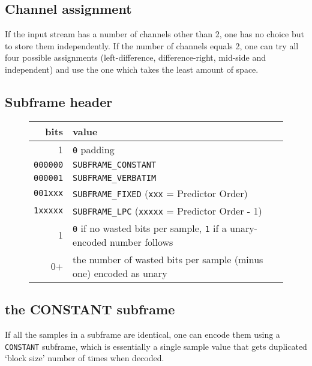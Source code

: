 
\subsection{Channel assignment}

If the input stream has a number of channels other than 2,
one has no choice but to store them independently.
If the number of channels equals 2, one can try all four possible
assignments (left-difference, difference-right, mid-side and
independent) and use the one which takes the least amount of space.

\subsection{Subframe header}
\begin{figure}[h]
\begin{tabular}{|r|l|}
\hline
bits & value \\
\hline
1 & \texttt{0} padding \\
\texttt{000000} & \texttt{SUBFRAME\_CONSTANT} \\
\texttt{000001} & \texttt{SUBFRAME\_VERBATIM} \\
\texttt{001xxx} & \texttt{SUBFRAME\_FIXED} (\texttt{xxx} = Predictor Order) \\
\texttt{1xxxxx} & \texttt{SUBFRAME\_LPC} (\texttt{xxxxx} = Predictor Order - 1) \\
1 & \texttt{0} if no wasted bits per sample, \texttt{1} if a unary-encoded number follows \\
0+ & the number of wasted bits per sample (minus one) encoded as unary \\
\hline
\end{tabular}
\end{figure}

\pagebreak

\subsection{the CONSTANT subframe}

If all the samples in a subframe are identical, one can encode them
using a \texttt{CONSTANT} subframe, which is essentially a single sample value
that gets duplicated `block size' number of times when decoded.

